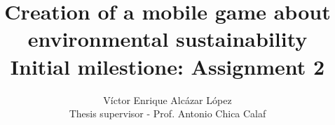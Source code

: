 

\title{Creation of a mobile game about environmental sustainability \\
 \large Initial milestione: Assignment 2}

\author{Víctor Enrique Alcázar López \\
	Thesis supervisor - Prof. Antonio Chica Calaf}




\maketitle
\tableofcontents






